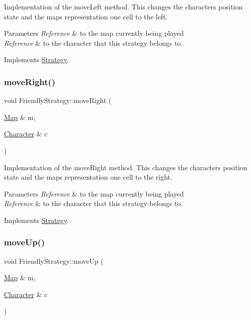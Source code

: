 Implementation of the move\+Left method. This changes the character\textquotesingle{}s position state and the map\textquotesingle{}s representation one cell to the left. 
\begin{DoxyParams}{Parameters}
{\em Reference} & to the map currently being played \\
\hline
{\em Reference} & to the character that this strategy belongs to. \\
\hline
\end{DoxyParams}


Implements \hyperlink{classStrategy}{Strategy}.

\hypertarget{classFriendlyStrategy_a7d8f63be4504e8b93e2aee921b2c3a84}{}\label{classFriendlyStrategy_a7d8f63be4504e8b93e2aee921b2c3a84} 
\subsubsection{\texorpdfstring{move\+Right()}{moveRight()}}
{\footnotesize\ttfamily void Friendly\+Strategy\+::move\+Right (\begin{DoxyParamCaption}\item[{\hyperlink{classMap}{Map} \&}]{m,  }\item[{\hyperlink{classCharacter}{Character} \&}]{c }\end{DoxyParamCaption})\hspace{0.3cm}{\ttfamily [virtual]}}

Implementation of the move\+Right method. This changes the character\textquotesingle{}s position state and the map\textquotesingle{}s representation one cell to the right. 
\begin{DoxyParams}{Parameters}
{\em Reference} & to the map currently being played \\
\hline
{\em Reference} & to the character that this strategy belongs to. \\
\hline
\end{DoxyParams}


Implements \hyperlink{classStrategy}{Strategy}.

\hypertarget{classFriendlyStrategy_a8113bb1bad52faedd1538eed7c01124b}{}\label{classFriendlyStrategy_a8113bb1bad52faedd1538eed7c01124b} 
\subsubsection{\texorpdfstring{move\+Up()}{moveUp()}}
{\footnotesize\ttfamily void Friendly\+Strategy\+::move\+Up (\begin{DoxyParamCaption}\item[{\hyperlink{classMap}{Map} \&}]{m,  }\item[{\hyperlink{classCharacter}{Character} \&}]{c }\end{DoxyParamCaption})\hspace{0.3cm}{\ttfamily [virtual]}}

